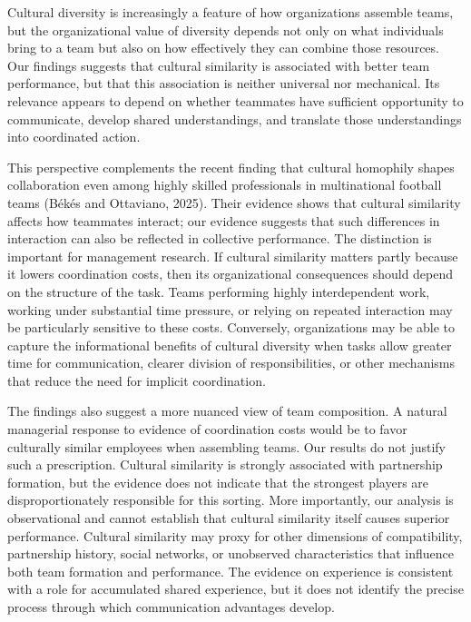 \documentclass[10pt]{article}
\begin{document}
Cultural diversity is increasingly a feature of how organizations assemble teams, but the organizational value of diversity depends not only on what individuals bring to a team but also on how effectively they can combine those resources. %
Our findings suggests that cultural similarity is associated with better team performance, but that this association is neither universal nor mechanical. Its relevance appears to depend on whether teammates have sufficient opportunity to communicate, develop shared understandings, and translate those understandings into coordinated action.

This perspective complements the recent finding that cultural homophily shapes collaboration even among highly skilled professionals in multinational football teams (Békés and Ottaviano, 2025). Their evidence shows that cultural similarity affects how teammates interact; our evidence suggests that such differences in interaction can also be reflected in collective performance. The distinction is important for management research. If cultural similarity matters partly because it lowers coordination costs, then its organizational consequences should depend on the structure of the task. Teams performing highly interdependent work, working under substantial time pressure, or relying on repeated interaction may be particularly sensitive to these costs. Conversely, organizations may be able to capture the informational benefits of cultural diversity when tasks allow greater time for communication, clearer division of responsibilities, or other mechanisms that reduce the need for implicit coordination.


The findings also suggest a more nuanced view of team composition. A natural managerial response to evidence of coordination costs would be to favor culturally similar employees when assembling teams. Our results do not justify such a prescription. Cultural similarity is strongly associated with partnership formation, but the evidence does not indicate that the strongest players are disproportionately responsible for this sorting. More importantly, our analysis is observational and cannot establish that cultural similarity itself causes superior performance. Cultural similarity may proxy for other dimensions of compatibility, partnership history, social networks, or unobserved characteristics that influence both team formation and performance. The evidence on experience is consistent with a role for accumulated shared experience, but it does not identify the precise process through which communication advantages develop.
\end{document}
